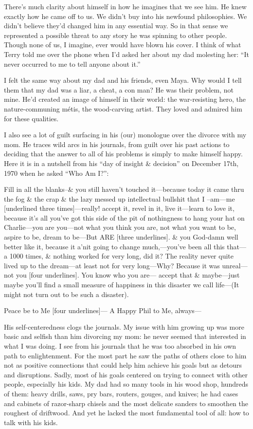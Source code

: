 \documentclass[12pt]{book}
\begin{document}
There's much clarity about himself in how he imagines that we see him. He knew exactly how he came off to us. We didn't buy into his newfound philosophies. We didn't believe they'd changed him in any essential way. So in that sense we represented a possible threat to any story he was spinning to other people. Though none of us, I imagine, ever would have blown his cover. I think of what Terry told me over the phone when I'd asked her about my dad molesting her: ``It never occurred to me to tell anyone about it.''

I felt the same way about my dad and his friends, even Maya. Why would I tell them that my dad was a liar, a cheat, a con man? He was their problem, not mine. He'd created an image of himself in their world: the war-resisting hero, the nature-communing m\'etis, the wood-carving artist. They loved and admired him for these qualities.

I also see a lot of guilt surfacing in his (our) monologue over the divorce with my mom. He traces wild arcs in his journals, from guilt over his past actions to deciding that the answer to all of his problems is simply to make himself happy. Here it is in a nutshell from his ``day of insight \& decision'' on December 17th, 1970 when he asked ``Who Am I?'':

Fill in all the blanks--\& you still haven't touched it---because today it came thru the fog \& the crap \& the lazy messed up intellectual bullshit that I –am---me [underlined three times]---really! accept it, revel in it, live it---learn to love it, because it's all you've got this side of the pit of nothingness to hang your hat on Charlie---you are you---not what you think you are, not what you want to be, aspire to be, dream to be---But ARE [three underlines]. \& you God-damn well better like it, because it a'nit going to change much,---you've been all this that---a 1000 times, \& nothing worked for very long, did it? The reality never quite lived up to the dream---at least not for very long---Why? Because it was unreal---not you [four underlines]. You know who you are--- accept that \& maybe---just maybe you'll find a small measure of happiness in this disaster we call life---(It might not turn out to be such a disaster).

Peace be to Me [four underlines]--- A Happy Phil to Me, always---

His self-centeredness clogs the journals. My issue with him growing up was more basic and selfish than him divorcing my mom: he never seemed that interested in what I was doing. I see from his journals that he was too absorbed in his own path to enlightenment. For the most part he saw the paths of others close to him not as positive connections that could help him achieve his goals but as detours and disruptions. Sadly, most of his goals centered on trying to connect with other people, especially his kids. My dad had so many tools in his wood shop, hundreds of them: heavy drills, saws, pry bars, routers, gouges, and knives; he had cases and cabinets of razor-sharp chisels and the most delicate sanders to smoothen the roughest of driftwood. And yet he lacked the most fundamental tool of all: how to talk with his kids.
\end{document}
